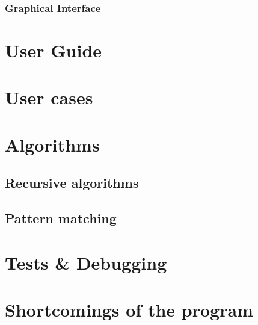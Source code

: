 \documentclass[11pt]{article}
\begin{document}
\subsubsection{Graphical Interface}
\section{User Guide}
\section{User cases}
\section{Algorithms}
\subsection{Recursive algorithms}
\subsection{Pattern matching}
\section{Tests \& Debugging}
\section{Shortcomings of the program}
\end{document}
